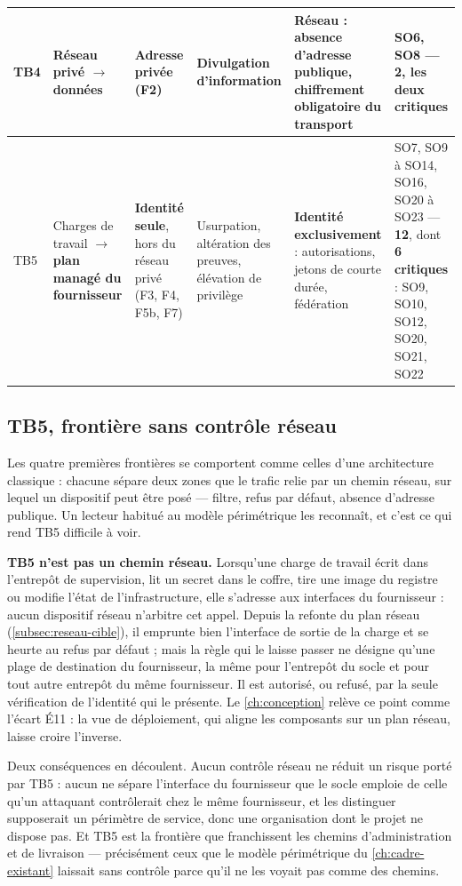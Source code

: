 {\begin{longtable}{|P{0.75cm}|P{2.45cm}|P{2.2cm}|P{2.35cm}|P{3.6cm}|P{3.5cm}|}
TB4 & Réseau privé $\rightarrow$ données & Adresse privée (F2) & Divulgation d'information & Réseau : absence d'adresse publique, chiffrement obligatoire du transport & SO6, SO8 --- \textbf{2}, les deux critiques \\ \hline
TB5 & Charges de travail $\rightarrow$ \textbf{plan managé du fournisseur} & \textbf{Identité seule}, hors du réseau privé (F3, F4, F5b, F7) & Usurpation, altération des preuves, élévation de privilège & \textbf{Identité exclusivement} : autorisations, jetons de courte durée, fédération & SO7, SO9 à SO14, SO16, SO20 à SO23 --- \textbf{12}, dont \textbf{6 critiques} : SO9, SO10, SO12, SO20, SO21, SO22 \\
\hline
\end{longtable}
}

\subsection{TB5, frontière sans contrôle réseau}

Les quatre premières frontières se comportent comme celles d'une architecture classique : chacune
sépare deux zones que le trafic relie par un chemin réseau, sur lequel un dispositif peut être
posé — filtre, refus par défaut, absence d'adresse publique. Un lecteur habitué au modèle
périmétrique les reconnaît, et c'est ce qui rend TB5 difficile à voir.

\textbf{TB5 n'est pas un chemin réseau.} Lorsqu'une charge de travail écrit dans l'entrepôt de
supervision, lit un secret dans le coffre, tire une image du registre ou modifie l'état de
l'infrastructure, elle s'adresse aux interfaces du fournisseur : aucun dispositif réseau
n'arbitre cet appel. Depuis la refonte du plan réseau (\cref{subsec:reseau-cible}), il emprunte
bien l'interface de sortie de la charge et se heurte au refus par défaut ; mais la règle qui le
laisse passer ne désigne qu'une plage de destination du fournisseur, la même pour l'entrepôt du
socle et pour tout autre entrepôt du même fournisseur. Il est autorisé, ou refusé, par la seule
vérification de l'identité qui le présente. Le \cref{ch:conception} relève ce point comme l'écart É11 : la
vue de déploiement, qui aligne les composants sur un plan réseau, laisse croire l'inverse.

Deux conséquences en découlent. Aucun contrôle réseau ne réduit un risque porté par TB5 : aucun ne
sépare l'interface du fournisseur que le socle emploie de celle qu'un attaquant contrôlerait chez
le même fournisseur, et les distinguer supposerait un périmètre de service, donc une organisation
dont le projet ne dispose pas. Et TB5 est la frontière que franchissent les chemins
d'administration et de livraison --- précisément ceux que le modèle périmétrique du \cref{ch:cadre-existant}
laissait sans contrôle parce qu'il ne les voyait pas comme des chemins.

